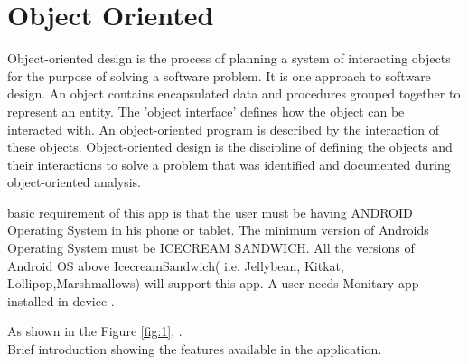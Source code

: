 
\section{Object Oriented}

Object-oriented design is the process of planning a system of interacting objects for the purpose of solving a software problem. It is one approach to software design. An object contains encapsulated data and procedures grouped together to represent an entity. The 'object interface' defines how the object can be interacted with. An object-oriented program is described by the interaction of these objects. Object-oriented design is the discipline of defining the objects and their interactions to solve a problem that was identified and documented during object-oriented analysis.

\iffalse
 basic requirement of this app is that the user must be having ANDROID
Operating System in his phone or tablet. The minimum version of Androids Operating
System must be ICECREAM SANDWICH. All the versions of Android OS above
IcecreamSandwich( i.e. Jellybean, Kitkat, Lollipop,Marshmallows) will support this
app. A user needs Monitary app installed in device .


\noindent As shown in the Figure \ref{fig:1}, .\\Brief introduction showing the features available in the application.

